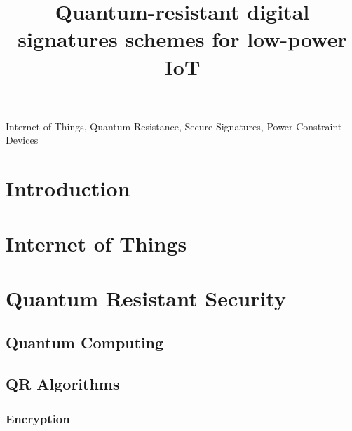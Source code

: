 \documentclass[conference]{IEEEtran}
\begin{document}
\title{Quantum-resistant digital signatures schemes for low-power IoT}

\author{
}

\maketitle

\begin{abstract}
\end{abstract}

\begin{IEEEkeywords}
Internet of Things, Quantum Resistance, Secure Signatures, Power Constraint Devices
\end{IEEEkeywords}


\section{Introduction}

\section{Internet of Things}

\section{Quantum Resistant Security}
\subsection{Quantum Computing}
\subsection{QR Algorithms}
\subsubsection{Encryption}
\end{document}

